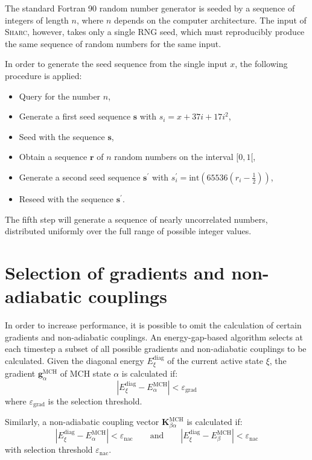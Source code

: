 \documentclass[a4paper,11pt,DIV=15,openany,twoside=false]{scrbook}
\newcommand{\sharc}{\textsc{Sharc}}
\newcommand{\VEC}[1]{\ensuremath{\mathbf{#1}}}
\begin{document}
The standard Fortran 90 random number generator is seeded by a sequence of integers of length $n$, where $n$ depends on the computer architecture. The input of \sharc, however, takes only a single RNG seed, which must reproducibly produce the same sequence of random numbers for the same input.

In order to generate the seed sequence from the single input $x$, the following procedure is applied:
\begin{itemize}
  \item Query for the number $n$,
  \item Generate a first seed sequence $\VEC{s}$ with $s_i=x+37i+17i^2$,
  \item Seed with the sequence $\VEC{s}$,
  \item Obtain a sequence $\VEC{r}$ of $n$ random numbers on the interval $[0,1[$,
  \item Generate a second seed sequence $\VEC{s}^\prime$ with $s_i^\prime=\text{int}\left(65536(r_i-\frac{1}{2})\right)$,
  \item Reseed with the sequence $\VEC{s}^\prime$.
\end{itemize}
The fifth step will generate a sequence of nearly uncorrelated numbers, distributed uniformly over the full range of possible integer values. 


\section{Selection of gradients and non-adiabatic couplings}\label{met:selection}

In order to increase performance, it is possible to omit the calculation of certain gradients and non-adiabatic couplings. An energy-gap-based algorithm selects at each timestep a subset of all possible gradients and non-adiabatic couplings to be calculated. Given the diagonal energy $E^{\text{diag}}_\xi$ of the current active state $\xi$, the gradient $\VEC{g}^{\text{MCH}}_\alpha$ of MCH state $\alpha$ is calculated if:
\begin{equation}
  \left|
    E^{\text{diag}}_\xi - E^{\text{MCH}}_\alpha
  \right|
  <
  \varepsilon_\text{grad}
\end{equation}
where $\varepsilon_\text{grad}$ is the selection threshold.

Similarly, a non-adiabatic coupling vector $\VEC{K}^{\text{MCH}}_{\beta\alpha}$ is calculated if:
\begin{equation}
  \left|
    E^{\text{diag}}_\xi - E^{\text{MCH}}_\alpha
  \right|
  <
  \varepsilon_\text{nac}
  \qquad\text{and}\qquad
  \left|
    E^{\text{diag}}_\xi - E^{\text{MCH}}_\beta
  \right|
  <
  \varepsilon_\text{nac}
\end{equation}
with selection threshold $\varepsilon_\text{nac}$.
\end{document}
